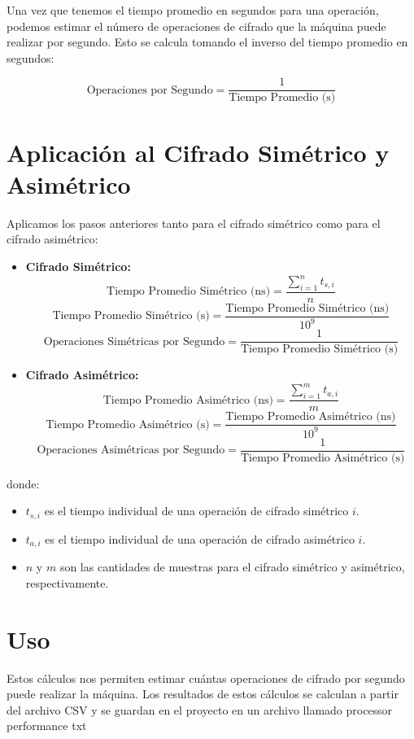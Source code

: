 \documentclass{article}
\begin{document}
Una vez que tenemos el tiempo promedio en segundos para una operación, podemos estimar el número de operaciones de cifrado que la máquina puede realizar por segundo. Esto se calcula tomando el inverso del tiempo promedio en segundos:

\begin{equation}
    \text{Operaciones por Segundo} = \frac{1}{\text{Tiempo Promedio (s)}}
\end{equation}

\section*{Aplicación al Cifrado Simétrico y Asimétrico}

Aplicamos los pasos anteriores tanto para el cifrado simétrico como para el cifrado asimétrico:

\begin{itemize}
    \item \textbf{Cifrado Simétrico:}
    \begin{equation}
        \text{Tiempo Promedio Simétrico (ns)} = \frac{\sum_{i=1}^{n} t_{s,i}}{n}
    \end{equation}
    \begin{equation}
        \text{Tiempo Promedio Simétrico (s)} = \frac{\text{Tiempo Promedio Simétrico (ns)}}{10^9}
    \end{equation}
    \begin{equation}
        \text{Operaciones Simétricas por Segundo} = \frac{1}{\text{Tiempo Promedio Simétrico (s)}}
    \end{equation}

    \item \textbf{Cifrado Asimétrico:}
    \begin{equation}
        \text{Tiempo Promedio Asimétrico (ns)} = \frac{\sum_{i=1}^{m} t_{a,i}}{m}
    \end{equation}
    \begin{equation}
        \text{Tiempo Promedio Asimétrico (s)} = \frac{\text{Tiempo Promedio Asimétrico (ns)}}{10^9}
    \end{equation}
    \begin{equation}
        \text{Operaciones Asimétricas por Segundo} = \frac{1}{\text{Tiempo Promedio Asimétrico (s)}}
    \end{equation}
\end{itemize}

donde:
\begin{itemize}
    \item \( t_{s,i} \) es el tiempo individual de una operación de cifrado simétrico \( i \).
    \item \( t_{a,i} \) es el tiempo individual de una operación de cifrado asimétrico \( i \).
    \item \( n \) y \( m \) son las cantidades de muestras para el cifrado simétrico y asimétrico, respectivamente.
\end{itemize}

\section*{Uso}
Estos cálculos nos permiten estimar cuántas operaciones de cifrado por segundo puede realizar la máquina. Los resultados de estos cálculos se calculan a partir del archivo CSV y se guardan en el proyecto en un archivo llamado processor performance txt
\end{document}
